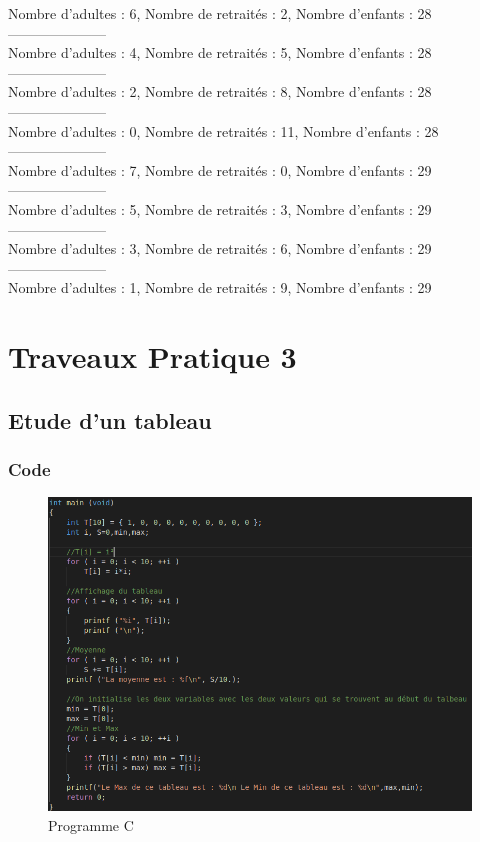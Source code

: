 \documentclass[10pt,a4paper]{article}
\begin{document}
Nombre d'adultes : 6, Nombre de retraités : 2, Nombre d'enfants : 28\\
---------------------\\
Nombre d'adultes : 4, Nombre de retraités : 5, Nombre d'enfants : 28\\
---------------------\\
Nombre d'adultes : 2, Nombre de retraités : 8, Nombre d'enfants : 28\\
---------------------\\
Nombre d'adultes : 0, Nombre de retraités : 11, Nombre d'enfants : 28\\
---------------------\\
Nombre d'adultes : 7, Nombre de retraités : 0, Nombre d'enfants : 29\\
---------------------\\
Nombre d'adultes : 5, Nombre de retraités : 3, Nombre d'enfants : 29\\
---------------------\\
Nombre d'adultes : 3, Nombre de retraités : 6, Nombre d'enfants : 29\\
---------------------\\
Nombre d'adultes : 1, Nombre de retraités : 9, Nombre d'enfants : 29\\ 

\pagebreak
\section{Traveaux Pratique 3}

\subsection{Etude d'un tableau}
\subsubsection{Code}
\begin{figure}[h]
\begin{center}
\includegraphics[scale=.3]{images/tab_1_c}
\end{center}
\caption{Programme C}
\end{figure}
\end{document}
